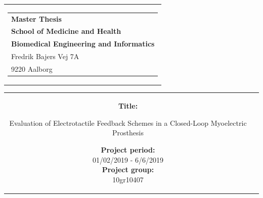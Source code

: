 % 
\thispagestyle{empty}
\begin{titlepage}
	\begin{nopagebreak}
		{\samepage 
			
			\begin{tabular}{r}
				\parbox{\textwidth}{  
					\hfill \hspace{2cm} \parbox{8cm}{\begin{tabular}{l} %
							{\small \textbf{\textcolor{aaublue}{Master Thesis}}}\\
							{\small \textbf{\textcolor{aaublue}{School of Medicine and Health}}}\\
							{\small \textbf{\textcolor{aaublue}{Biomedical Engineering and Informatics}}}\\
							{\small \textcolor{aaublue}{Fredrik Bajers Vej 7A}} \\
							{\small \textcolor{aaublue}{9220 Aalborg}} \\
				\end{tabular}}}
			\end{tabular}
			
			\begin{tabular}{cc}
				\parbox{7cm}{
					
					\textbf{Title:}
					
					Evaluation of Electrotactile Feedback Schemes in a
					Closed-Loop Myoelectric Prosthesis \\ 
					
%					
					
					
					\parbox{8cm}{
						
						
						\textbf{Project period:}\\
						01/02/2019 - 6/6/2019\\
						
						\textbf{Project group:}\\
						10gr10407\\ %
						
}}
\end{tabular}}
\end{nopagebreak}
\end{titlepage}
